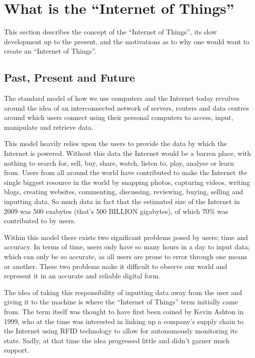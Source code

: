 \section{What is the ``Internet of Things''} %
\label{sec:internet_of_things_paradigm}
This section describes the concept of the ``Internet of Things'', its slow development up to the present, and the motivations as to why one would want to create an ``Internet of Things''.

\subsection{Past, Present and Future} %
\label{sub:past_present_and_future}

The standard model of how we use computers and the Internet today revolves around the idea of an interconnected network of servers, routers and data centres around which users connect using their personal computers to access, input, manipulate and retrieve data. 

This model heavily relies upon the users to provide the data by which the Internet is powered. Without this data the Internet would be a barren place, with nothing to search for, sell, buy, share, watch, listen to, play, analyse or learn from.
Users from all around the world have contributed to make the Internet \textit{the} single biggest resource in the world by snapping photos, capturing videos, writing blogs, creating websites, commenting, discussing, reviewing, buying, selling and inputting data. So much data in fact that the estimated size of the Internet in 2009 was 500 exabytes (that's 500 BILLION gigabytes), of which 70\% was contributed to by users.\cite{Size}   

Within this model there exists two significant problems posed by users; time and accuracy. In terms of time, users only have so many hours in a day to input data; which can only be so accurate, as all users are prone to error through one means or another.
These two problems make it difficult to observe our world and represent it in an accurate and reliable digital form.

The idea of taking this responsibility of inputting data away from the user and giving it to the machine is where the ``Internet of Things'' term initially came from. The term itself was thought to have first been coined by Kevin Ashton\cite{K.Ashton} in 1999, who at the time was interested in linking up a company's supply chain to the Internet using RFID technology to allow for autonomously monitoring its state.
Sadly, at that time the idea progressed little and didn't garner much support.

